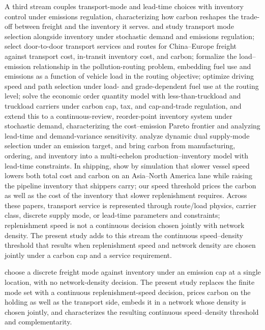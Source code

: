 \documentclass[11pt]{article}
\theoremstyle{definition}
\theoremstyle{remark}
\theoremstyle{plain}
\begin{document}
A third stream couples transport-mode and lead-time choices with inventory control under emissions regulation,
characterizing how carbon reshapes the trade-off between freight and the inventory it serves.
\citet{hoen2014effect} and \citet{chen2016effects} study transport mode selection alongside
inventory under stochastic demand and emissions regulation; \citet{qi2022transport} select door-to-door transport
services and routes for China--Europe freight against transport cost, in-transit inventory cost, and carbon; \citet{bektas2011pollution} formalize the
load--emission relationship in the pollution-routing problem, embedding fuel use and emissions as a function
of vehicle load in the routing objective; \citet{moradi2025load} optimize driving speed and path selection
under load- and grade-dependent fuel use at the routing level; \citet{konur2014integrated} solve the economic
order quantity model with less-than-truckload and truckload carriers under carbon cap, tax, and cap-and-trade
regulation, and \citet{schaefer2015economic} extend this to a continuous-review, reorder-point inventory system under stochastic
demand, characterizing the cost--emission Pareto frontier and analyzing lead-time and demand-variance
sensitivity. \citet{drent2023efficient} analyze dynamic dual supply-mode selection under an emission target,
and \citet{hammami2015carbon} bring carbon from manufacturing, ordering, and inventory into a multi-echelon
production--inventory model with lead-time constraints. In shipping, \citet{maloni2013slow} show by simulation
that slower vessel speed lowers both total cost and carbon on an Asia--North America lane while raising the
pipeline inventory that shippers carry; our speed threshold prices the carbon as well as the cost of the
inventory that slower replenishment requires. Across these papers, transport service is represented
through route/load physics, carrier class, discrete supply mode, or lead-time parameters and constraints; replenishment
speed is not a continuous decision chosen jointly with network density. The present study adds to this stream the continuous speed--density
threshold that results when replenishment speed and network density are chosen jointly under a carbon cap
and a service requirement.

\citet{boone2025freight} choose a discrete freight mode against inventory under an emission cap at a single
location, with no network-density decision. The present study replaces the finite mode set with a continuous
replenishment-speed decision, prices carbon on the holding as well as the transport side, embeds it in a network
whose density is chosen jointly, and characterizes the resulting continuous speed--density threshold and
complementarity.
\end{document}

